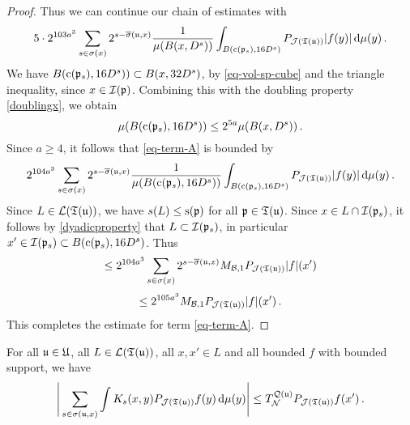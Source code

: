 \begin{proof}
    Thus we can continue our chain of estimates with
    $$
        5\cdot 2^{103a^3} \sum_{s\in\sigma(x)}2^{s - \overline{\sigma}({\mathfrak u}, x)} \frac{1}{\mu(B(x,D^s))}\int_{B({\mathrm{c}}({\mathfrak p}_s),16 D^s)}P_{\mathcal{J}({\mathfrak T}({\mathfrak u}))}|f(y)|\,\mathrm{d}\mu(y)\,.
    $$
    We have $B({\mathrm{c}}({\mathfrak p}_s), 16D^s)) \subset B(x, 32D^s)$, by \eqref{eq-vol-sp-cube} and the triangle inequality, since $x \in {\mathcal{I}}({\mathfrak p})$. Combining this with the doubling property \eqref{doublingx}, we obtain
    $$
        \mu(B({\mathrm{c}}({\mathfrak p}_s), 16D^s)) \le 2^{5a} \mu(B(x, D^s))\,.
    $$
    Since $a \ge 4$, it follows that \eqref{eq-term-A} is bounded by
    $$
        2^{104a^3} \sum_{s\in\sigma(x)}2^{s - \overline{\sigma}({\mathfrak u}, x)} \frac{1}{\mu(B({\mathrm{c}}({\mathfrak p}_s),16D^s))}\int_{B({\mathrm{c}}({\mathfrak p}_s),16D^s)}P_{\mathcal{J}({\mathfrak T}({\mathfrak u}))}|f(y)|\,\mathrm{d}\mu(y)\,.
    $$
    Since $L \in \mathcal{L}({\mathfrak T}({\mathfrak u}))$, we have $s(L) \le {\mathrm{s}}({\mathfrak p})$ for all ${\mathfrak p} \in {\mathfrak T}({\mathfrak u})$. Since $x\in L \cap {\mathcal{I}}({\mathfrak p}_s)$, it follows by \eqref{dyadicproperty} that $L \subset {\mathcal{I}}({\mathfrak p}_s)$, in particular $x' \in {\mathcal{I}}({\mathfrak p}_s) \subset B({\mathrm{c}}({\mathfrak p}_s), 16D^s)$. Thus
    $$
        \le 2^{104a^3} \sum_{s\in\sigma(x)}2^{s - \overline{\sigma}({\mathfrak u}, x)} M_{\mathcal{B}, 1}P_{\mathcal{J}({\mathfrak T}({\mathfrak u}))}|f|(x')
    $$
    $$
        \le 2^{105a^3} M_{\mathcal{B}, 1}P_{\mathcal{J}({\mathfrak T}({\mathfrak u}))}|f|(x')\,.
    $$
    This completes the estimate for term \eqref{eq-term-A}.
\end{proof}

\begin{lemma}
    \label{second-tree-pointwise}
    \leanok
    For all ${\mathfrak u} \in {\mathfrak U}$, all $L \in \mathcal{L}({\mathfrak T}({\mathfrak u}))$, all $x, x' \in L$ and all bounded $f$ with bounded support, we have
    $$
         \Bigg| \sum_{s \in \sigma({\mathfrak u}, x)} \int K_s(x,y) P_{\mathcal{J}({\mathfrak T}({\mathfrak u}))} f(y) \, \mathrm{d}\mu(y) \Bigg| \le T_{\mathcal{N}}^{{\mathcal{Q}}({\mathfrak u})} P_{\mathcal{J}({\mathfrak T}({\mathfrak u}))} f(x')\,.
    $$
\end{lemma}

